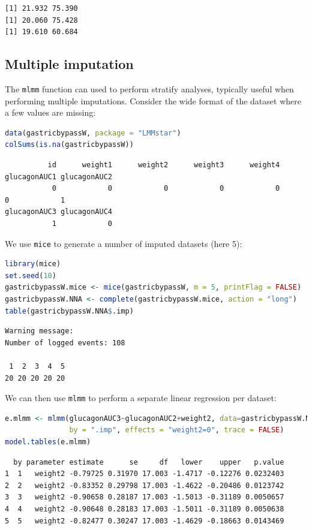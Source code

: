 \documentclass[12pt]{article}
\begin{document}
\label{}
\begin{verbatim}
[1] 21.932 75.390
[1] 20.060 75.428
[1] 19.610 60.684
\end{verbatim}


\clearpage
\subsection{Multiple imputation}
\label{sec:orgb1a708f}

The \texttt{mlmm} function can used to perform stratify analyses, typically
useful when performing multiple imputations. Consider the wide format
of the dataset where a few values are missing:
\begin{lstlisting}[language=r,numbers=none]
data(gastricbypassW, package = "LMMstar")
colSums(is.na(gastricbypassW))
\end{lstlisting}

\label{}
\begin{verbatim}
          id      weight1      weight2      weight3      weight4 glucagonAUC1 glucagonAUC2 
           0            0            0            0            0            0            1 
glucagonAUC3 glucagonAUC4 
           1            0
\end{verbatim}


We use \texttt{mice} to generate a number of imputed datasets (here 5):
\begin{lstlisting}[language=r,numbers=none]
library(mice)
set.seed(10)
gastricbypassW.mice <- mice(gastricbypassW, m = 5, printFlag = FALSE)
gastricbypassW.NNA <- complete(gastricbypassW.mice, action = "long")
table(gastricbypassW.NNA$.imp)
\end{lstlisting}

\label{}
\begin{verbatim}
Warning message:
Number of logged events: 108

 1  2  3  4  5 
20 20 20 20 20
\end{verbatim}


We can then use \texttt{mlmm} to perform a separate linear regression per dataset:
\begin{lstlisting}[language=r,numbers=none]
e.mlmm <- mlmm(glucagonAUC3~glucagonAUC2+weight2, data=gastricbypassW.NNA,
               by = ".imp", effects = "weight2=0", trace = FALSE)
model.tables(e.mlmm)
\end{lstlisting}

\label{}
\begin{verbatim}
  by parameter estimate      se     df   lower    upper   p.value
1  1   weight2 -0.79725 0.31970 17.003 -1.4717 -0.12276 0.0232403
2  2   weight2 -0.83352 0.29798 17.003 -1.4622 -0.20486 0.0123742
3  3   weight2 -0.90658 0.28187 17.003 -1.5013 -0.31189 0.0050657
4  4   weight2 -0.90648 0.28183 17.003 -1.5011 -0.31189 0.0050638
5  5   weight2 -0.82477 0.30247 17.003 -1.4629 -0.18663 0.0143469
\end{verbatim}
\end{document}
